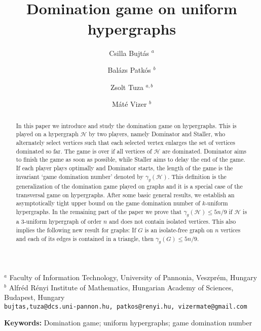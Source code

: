 \documentclass[12pt]{article}
\newcommand\cH{{\mathcal H}}
\begin{document}
\title{\vspace{-2.9cm} ~~ \\ Domination game on uniform hypergraphs}

\author{
Csilla Bujt{\'a}s $^{a}$
\and
Bal{\'a}zs Patk{\'o}s $^{b}$
\and
Zsolt Tuza $^{a,b}$
\and
M{\'a}t{\'e} Vizer $^{b}$
}

\maketitle

\begin{center}
$^a$ Faculty of Information Technology, University of Pannonia, Veszpr\'em, Hungary\\
\medskip
$^b$ Alfr\'ed R\'enyi Institute of Mathematics, Hungarian Academy of Sciences, Budapest, Hungary\\
\medskip
\small \texttt{bujtas,tuza@dcs.uni-pannon.hu, patkos@renyi.hu, vizermate@gmail.com}
\medskip
\end{center}


\begin{abstract}
In this paper we introduce and study the domination game on hypergraphs. This is played on a hypergraph $\cH$ by two players, namely Dominator and Staller, who alternately select vertices such that each selected vertex enlarges the set of vertices dominated so far. The game is over if all vertices of $\cH$ are dominated. Dominator aims to finish the game as soon as possible, while Staller aims to delay the end of the game. If each player plays optimally and Dominator starts, the length of the game is the invariant `game domination number' denoted by $\gamma_g(\cH)$. This definition is the generalization of the domination game played on graphs and it is a special case of the transversal game on hypergraphs. After some basic general results, we establish an asymptotically tight upper bound on the game domination number of $k$-uniform hypergraphs. In the remaining part of the paper we prove that $\gamma_g(\cH) \le 5n/9$ if $\cH$ is a 3-uniform hypergraph of order $n$ and does not contain isolated vertices. This also implies the following new result for graphs: If $G$ is an isolate-free graph on $n$ vertices and each of its edges is contained in a triangle, then $\gamma_g(G) \le 5n/9$.


\end{abstract}


\noindent
{\bf Keywords:} Domination game; uniform hypergraphs; game domination number  \\
\end{document}
